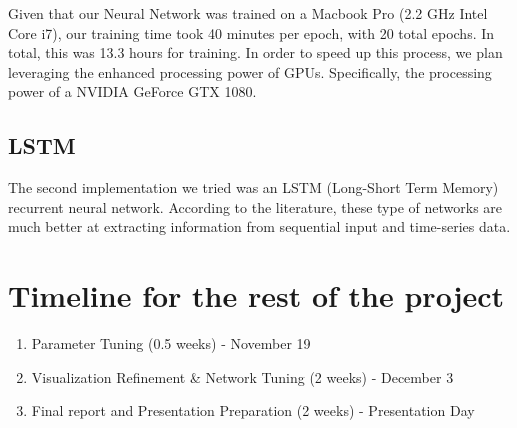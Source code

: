 \documentclass[11pt,a4paper]{article}
\begin{document}
Given that our Neural Network was trained on a Macbook Pro (2.2 GHz Intel Core i7), our training time took 40 minutes per epoch, with 20 total epochs. In total, this was 13.3 hours for training. In order to speed up this process, we plan leveraging the enhanced processing power of GPUs. Specifically, the processing power of a NVIDIA GeForce GTX 1080. 

\subsection{LSTM}   

The second implementation we tried was an LSTM (Long-Short Term Memory) recurrent neural network. According to the literature, these type of networks are much better at extracting information from sequential input and time-series data.


    \section{Timeline for the rest of the project}

\begin{enumerate}
    \item Parameter Tuning (0.5 weeks) - November 19
    \item Visualization Refinement \& Network Tuning (2 weeks) - December 3
    \item Final report and Presentation Preparation (2 weeks) - Presentation Day
\end{enumerate}

    
    
    
    \footnotesize
    
    
    
    
\end{document}
